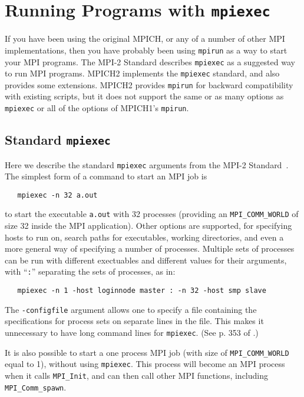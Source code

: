 \documentclass[dvipdfm,11pt]{article}
\begin{document}


\section{Running Programs with \texttt{mpiexec}}
\label{sec:mpiexec}

If you have been using the original MPICH, or any of a number of other MPI
implementations, then you have probably been using \texttt{mpirun} as a
way to start your MPI programs.
The MPI-2 Standard describes \texttt{mpiexec} as a suggested way to run
MPI programs.  MPICH2 implements the \texttt{mpiexec} standard, and also
provides some extensions.  MPICH2 provides \texttt{mpirun} for backward
compatibility with existing scripts, but it does not support the same or
as many options as \texttt{mpiexec} or all of the options of MPICH1's
\texttt{mpirun}.   

\subsection{Standard \texttt{mpiexec}}
\label{sec:mpiexec-standard}

Here we describe the standard \texttt{mpiexec} arguments from the MPI-2
Standard~\cite{mpi-forum:mpi2-journal}.  The simplest form of a command
to start an MPI job is 
\begin{verbatim}
   mpiexec -n 32 a.out
\end{verbatim}
to start the executable \texttt{a.out} with 32 processes (providing an
\texttt{MPI\_COMM\_WORLD} of size 32 inside the MPI application).  Other
options are supported, for specifying hosts to run on,  search paths for
executables, working directories, and even a more general way of
specifying a number of processes.  Multiple sets of processes can be run
with different exectuables and different values for their arguments,
with ``\texttt{:}'' separating the sets of processes, as in:
\begin{verbatim}
   mpiexec -n 1 -host loginnode master : -n 32 -host smp slave
\end{verbatim}
The \texttt{-configfile} argument allows one to specify a file containing the
specifications for process sets on separate lines in the file.  This
makes it unnecessary to have long command lines for \texttt{mpiexec}.  
(See p. 353 of \cite{Snir:1998:MPI2Book}.)

It is also possible to start a one process MPI job (with size of
\texttt{MPI\_COMM\_WORLD} equal to 1), without using \texttt{mpiexec}.
This process will become an MPI process when it calls
\texttt{MPI\_Init}, and can then call other MPI functions, including
\texttt{MPI\_Comm\_spawn}. 
\end{document}
